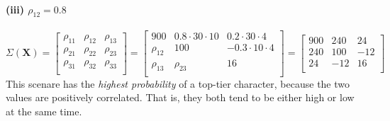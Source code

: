 \documentclass[a4paper,english,12pt]{article}
\begin{document}
\paragraph{(iii) $\rho_{12} = 0.8$}
\[
  \Sigma\left(\textbf{X}\right) =
    \begin{bmatrix}
      \rho_{11} & \rho_{12} & \rho_{13} \\
      \rho_{21} & \rho_{22} & \rho_{23} \\
      \rho_{31} & \rho_{32} & \rho_{33} \\
    \end{bmatrix}
  =
    \begin{bmatrix}
      900       & 0.8 \cdot 30 \cdot 10 & 0.2 \cdot 30 \cdot 4 \\
      \rho_{12} & 100                    & -0.3 \cdot 10 \cdot 4 \\
      \rho_{13} & \rho_{23}              & 16 \\
    \end{bmatrix}
  =
    \begin{bmatrix}
      900       & 240                    & 24 \\
      240       & 100                    & -12 \\
       24       & -12                    & 16 \\
    \end{bmatrix}
\]
This scenare has the \textit{highest probability} of a top-tier character,
because the two values are positively correlated. That is, they both tend to be
either high or low at the same time.


\clearpage


\end{document}
